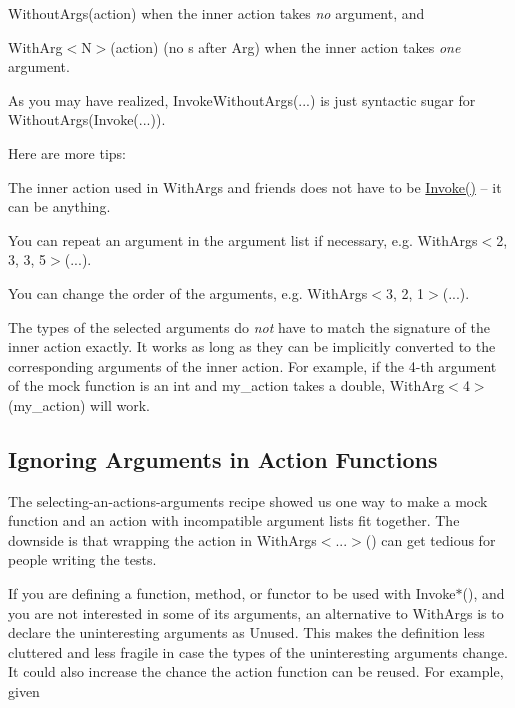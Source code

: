 \begin{DoxyItemize}
\item {\ttfamily Without\+Args(action)} when the inner {\ttfamily action} takes {\itshape no} argument, and
\item {\ttfamily With\+Arg$<$N$>$(action)} (no {\ttfamily s} after {\ttfamily Arg}) when the inner {\ttfamily action} takes {\itshape one} argument.
\end{DoxyItemize}

As you may have realized, {\ttfamily Invoke\+Without\+Args(...)} is just syntactic sugar for {\ttfamily Without\+Args(\+Invoke(...))}.

Here are more tips\+:


\begin{DoxyItemize}
\item The inner action used in {\ttfamily With\+Args} and friends does not have to be {\ttfamily \mbox{\hyperlink{namespacetesting_af5cacf4475557b5a3e37af3836564235}{Invoke()}}} -- it can be anything.
\item You can repeat an argument in the argument list if necessary, e.\+g. {\ttfamily With\+Args$<$2, 3, 3, 5$>$(...)}.
\item You can change the order of the arguments, e.\+g. {\ttfamily With\+Args$<$3, 2, 1$>$(...)}.
\item The types of the selected arguments do {\itshape not} have to match the signature of the inner action exactly. It works as long as they can be implicitly converted to the corresponding arguments of the inner action. For example, if the 4-\/th argument of the mock function is an {\ttfamily int} and {\ttfamily my\+\_\+action} takes a {\ttfamily double}, {\ttfamily With\+Arg$<$4$>$(my\+\_\+action)} will work.
\end{DoxyItemize}

\subsection*{Ignoring Arguments in Action Functions}

The selecting-\/an-\/action\textquotesingle{}s-\/arguments recipe showed us one way to make a mock function and an action with incompatible argument lists fit together. The downside is that wrapping the action in {\ttfamily With\+Args$<$...$>$()} can get tedious for people writing the tests.

If you are defining a function, method, or functor to be used with {\ttfamily Invoke$\ast$()}, and you are not interested in some of its arguments, an alternative to {\ttfamily With\+Args} is to declare the uninteresting arguments as {\ttfamily Unused}. This makes the definition less cluttered and less fragile in case the types of the uninteresting arguments change. It could also increase the chance the action function can be reused. For example, given


